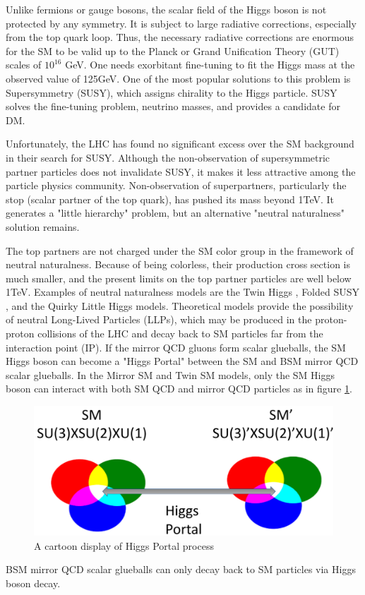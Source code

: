 Unlike fermions or gauge bosons, the scalar field of the Higgs boson is not protected by any symmetry. It is subject to large radiative corrections, especially from the top quark loop.
Thus, the necessary radiative corrections are enormous for the SM to be valid up to the Planck or Grand Unification Theory (GUT) scales of $10^{16}$ GeV.
One needs exorbitant fine-tuning to fit the Higgs mass at the observed value of 125GeV.
One of the most popular solutions to this problem is Supersymmetry (SUSY), which assigns chirality to the Higgs particle.
SUSY solves the fine-tuning problem, neutrino masses, and provides a candidate for DM.

Unfortunately, the LHC has found no significant excess over the SM background in their search for SUSY\cite{SUSY}.
Although the non-observation of supersymmetric partner particles does not invalidate SUSY, it makes it less attractive among the particle physics community.
Non-observation of superpartners, particularly the stop (scalar partner of the top quark), has pushed its mass beyond 1TeV.
It generates a "little hierarchy" problem, but an alternative "neutral naturalness" solution remains.

The top partners are not charged under the SM color group in the framework of neutral naturalness.
Because of being colorless, their production cross section is much smaller, and the present limits on the top partner particles are well below 1TeV.
Examples of neutral naturalness models are the Twin Higgs \cite{Chacko:2005pe},
Folded SUSY \cite{Burdman:2006tz}, and the Quirky Little Higgs \cite{Cai:2008au} models.
Theoretical models provide the possibility of neutral Long-Lived Particles (LLPs), which may be produced in the proton-proton
collisions of the LHC and decay back to SM particles far from the interaction point (IP).\cite{Craig:2015pha}
If the mirror QCD gluons form scalar glueballs, the SM Higgs boson can become a "Higgs Portal" between the SM and BSM mirror QCD scalar glueballs.
In the Mirror SM and Twin SM models, only the SM Higgs boson can interact with both SM QCD and mirror QCD particles as in figure \ref{fig:2HiggsPortal}.
\begin{figure}[h!]
  \caption{A cartoon display of Higgs Portal process}
  \label{fig:2HiggsPortal}
  \centering
  \includegraphics[width=0.87\linewidth]{figs/Portalcartoon.png}
\end{figure}
BSM mirror QCD scalar glueballs can only decay back to SM particles via Higgs boson decay.

